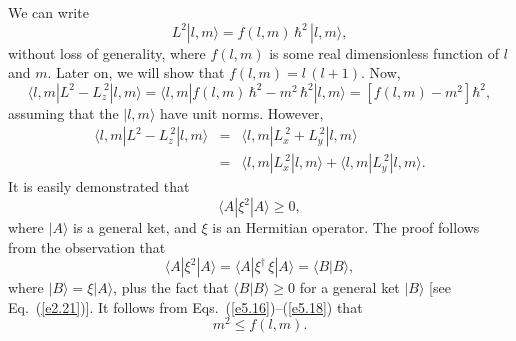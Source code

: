 We can write
\begin{equation}\label{e5.15}
L^2 |l, m\rangle = f(l,m)\, \hbar^2\,|l, m\rangle,
\end{equation}
without loss of generality, 
where $f(l,m)$ is some real dimensionless function of $l$ and $m$. Later on,
we will show that $f(l,m) = l\,(l+1)$. 
Now, 
\begin{equation}\label{e5.16}
\langle l, m | L^2 - L_z^{~2} |l, m\rangle =\langle l, m |
f(l, m) \,\hbar^2 - m^2\, \hbar^2 |l, m\rangle =[f(l,m) - m^2] \hbar^2,
\end{equation}
assuming that the $|l, m\rangle$ have unit norms. However,
\begin{eqnarray}
\langle l, m | L^2 - L_z^{~2}|l, m\rangle &=&\langle l, m |
L_x^{~2} + L_y^{~2} |l, m\rangle\nonumber 
\\[0.5ex]&=& \langle l, m |L_x^{~2}|l, m\rangle+
\langle l, m|L_y^{~2}|l, m\rangle.
\end{eqnarray}
It is easily demonstrated that
\begin{equation}\label{e5.18}
\langle A|\xi^2|A\rangle\geq 0,
\end{equation}
where $|A\rangle$ is a general  ket, and $\xi$ is an Hermitian operator. 
The proof follows from the observation that 
\begin{equation}
\langle A|\xi^2|A\rangle
= \langle A|\xi^{\dag}\, \xi |A\rangle = \langle B| B\rangle, 
\end{equation}
where $|B\rangle = \xi |A\rangle$, plus the fact that $\langle B|B\rangle\geq 0$
for a general  ket $|B\rangle$ [see Eq.~(\ref{e2.21})]. It follows from
Eqs.~(\ref{e5.16})--(\ref{e5.18}) that
\begin{equation}\label{e5.20}
m^2 \leq f(l,m).
\end{equation}

